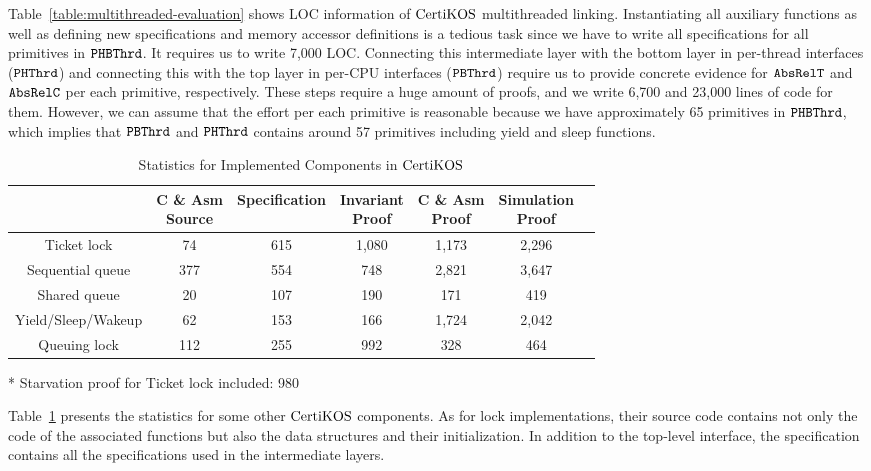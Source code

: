 Table~\ref{table:multithreaded-evaluation} shows LOC information of $\mathrm{CertiKOS}$ multithreaded linking.
Instantiating all auxiliary functions as well as defining new specifications and memory accessor definitions is a tedious task since
we have to write all specifications for all primitives in ${{\mathrm{\texttt{PHBThrd}}}}$. 
It requires us to write  7,000 LOC. 
Connecting this  intermediate layer with the bottom layer in per-thread interfaces (${{\mathrm{\texttt{PHThrd}}}}$) and 
connecting this with the top layer in per-CPU interfaces (${{\mathrm{\texttt{PBThrd}}}}$) require us 
to provide concrete evidence for ${{\mathrm{\texttt{AbsRelT}}}}$ and ${{\mathrm{\texttt{AbsRelC}}}}$ per each primitive, respectively.
These steps require a huge amount of proofs, and we write 6,700  and 23,000 lines of code for them. 
However,  we can assume that the effort per each primitive is reasonable because 
 we have approximately 65 primitives in ${{\mathrm{\texttt{PHBThrd}}}}$, which implies that  ${{\mathrm{\texttt{PBThrd}}}}$ and ${{\mathrm{\texttt{PHThrd}}}}$ contains around 57 primitives including yield and sleep functions.

\begin{table}
\begin{center}
\renewcommand{\arraystretch}{1.1}
\setlength{\tabcolsep}{0.3em}
\begin{tabular}{|c|c|c|c|c|c|c|}
\hline
 & \makecell{ C \& Asm \\Source} & Specification & \makecell{Invariant \\ Proof} & \makecell{C \& Asm \\Proof} & \makecell{Simulation \\ Proof} \\
\hline
Ticket lock & 74 & 615 & 1,080 & 1,173 & 2,296 \\
\hline
Sequential queue & 377 & 554 & 748 & 2,821& 3,647 \\
\hline
Shared queue &  20 & 107 & 190 & 171& 419\\
\hline
Yield/Sleep/Wakeup & 62 & 153 & 166 & 1,724 & 2,042 \\
\hline
Queuing lock & 112 & 255 & 992 & 328 & 464\\
\hline
\end{tabular}
\newline
\end{center}
\begin{flushright}
* Starvation proof for Ticket lock included: 980\\
\end{flushright}
\caption{Statistics for Implemented Components in $\mathrm{CertiKOS}$}
\label{table:certikos-evaluation}
\hrulefill
\end{table}
Table~\ref{table:certikos-evaluation} presents  the statistics for some other  $\mathrm{CertiKOS}$ components.
 As for lock implementations, their source code contains not only the code of the associated functions but also the data structures and their initialization. In addition to the top-level interface, the specification contains all the specifications used in the intermediate layers.

